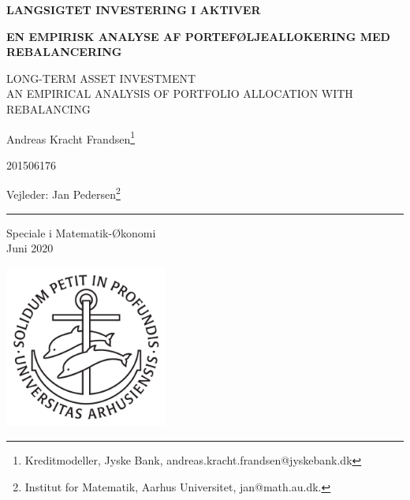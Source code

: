 \documentclass[
  a4paper,
  oneside]{memoir}
\author{}
\date{\vspace{-2.5em}}
\begin{document}
\begin{titlingpage}
\begin{center}
\LARGE \textbf{LANGSIGTET INVESTERING I AKTIVER}

\vspace{2mm}

\renewcommand{\thefootnote}{\fnsymbol{footnote}}
\large \textbf{EN EMPIRISK ANALYSE AF PORTEFØLJEALLOKERING MED REBALANCERING}

\tiny LONG-TERM ASSET INVESTMENT\\ AN EMPIRICAL ANALYSIS OF PORTFOLIO ALLOCATION WITH REBALANCING

\vspace{2mm}

\Large Andreas Kracht Frandsen\footnote{Kreditmodeller, Jyske Bank, andreas.kracht.frandsen@jyskebank.dk}

\Large 201506176

\Large Vejleder: Jan Pedersen\footnote{Institut for Matematik, Aarhus Universitet, jan@math.au.dk.}

\vspace{2mm}

\rule{1cm}{0.4pt}

\vspace{2mm}

Speciale i Matematik-Økonomi\\
Juni 2020

\vfill

\includegraphics[width=0.4\textwidth]{latex/ausegl_sort.pdf}

\vfill


\end{center}
\end{titlingpage}
\end{document}

